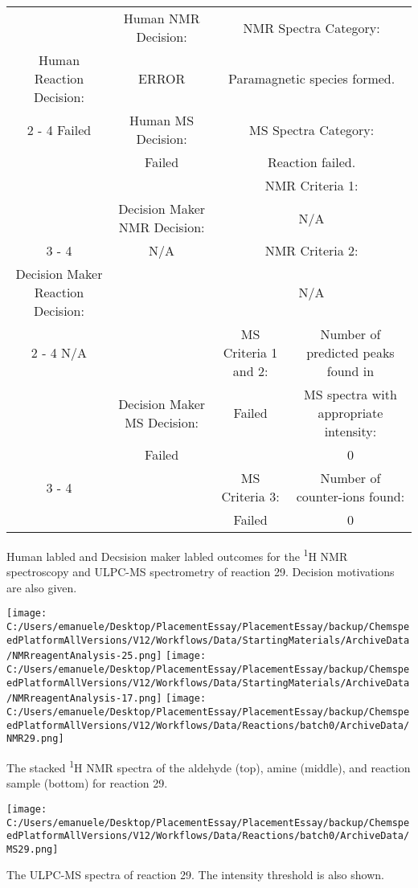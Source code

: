 \documentclass{article}%
\begin{document}
\begin{Decision Table}[H]%
\begin{tabular}{|c|c|c|c|}%
\hline%
&Human NMR Decision:&\multicolumn{2}{|c|}{NMR Spectra Category:}\\%
Human Reaction Decision:&ERROR&\multicolumn{2}{|c|}{Paramagnetic species formed.}\\%
\cline{2%
-%
4}%
Failed&Human MS Decision:&\multicolumn{2}{|c|}{MS Spectra Category:}\\%
&Failed&\multicolumn{2}{|c|}{Reaction failed.}\\%
\hline%
&&\multicolumn{2}{|c|}{NMR Criteria 1:}\\%
&Decision Maker NMR Decision:&\multicolumn{2}{|c|}{N/A}\\%
\cline{3%
-%
4}%
&N/A&\multicolumn{2}{|c|}{NMR Criteria 2:}\\%
Decision Maker Reaction Decision:&&\multicolumn{2}{|c|}{N/A}\\%
\cline{2%
-%
4}%
N/A&&MS Criteria 1 and 2:&Number of predicted peaks found in\\%
&Decision Maker MS Decision:&Failed&MS spectra with appropriate intensity:\\%
&Failed&&0\\%
\cline{3%
-%
4}%
&&MS Criteria 3:&Number of counter{-}ions found:\\%
&&Failed&0\\%
\hline%
\end{tabular}%
\caption{Human labled and Decsision maker labled outcomes for the \textsuperscript{1}H NMR spectroscopy and ULPC-MS spectrometry of reaction 29. Decision motivations are also given.}%
\end{Decision Table}%
\begin{NMR Spectra}[H]%
\begin{center}%
\texttt{[image: C:/Users/emanuele/Desktop/PlacementEssay/PlacementEssay/backup/ChemspeedPlatformAllVersions/V12/Workflows/Data/StartingMaterials/ArchiveData/NMRreagentAnalysis-25.png]}\hfill%
\texttt{[image: C:/Users/emanuele/Desktop/PlacementEssay/PlacementEssay/backup/ChemspeedPlatformAllVersions/V12/Workflows/Data/StartingMaterials/ArchiveData/NMRreagentAnalysis-17.png]}\hfill%
\texttt{[image: C:/Users/emanuele/Desktop/PlacementEssay/PlacementEssay/backup/ChemspeedPlatformAllVersions/V12/Workflows/Data/Reactions/batch0/ArchiveData/NMR29.png]}\hfill%
\end{center}%
\caption{The stacked \textsuperscript{1}H NMR spectra of the aldehyde (top), amine (middle), and reaction sample (bottom) for reaction 29.}%
\end{NMR Spectra}%
\begin{MS Spectra}[H]%
\begin{center}%
\texttt{[image: C:/Users/emanuele/Desktop/PlacementEssay/PlacementEssay/backup/ChemspeedPlatformAllVersions/V12/Workflows/Data/Reactions/batch0/ArchiveData/MS29.png]}\hfill%
\end{center}%
\caption{The ULPC-MS spectra of reaction 29. The intensity threshold is also shown.}%
\end{MS Spectra}%
\end{document}
